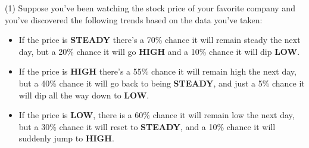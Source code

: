 \begin{tasks}[resume, style=enumerate](1)
\task
  Suppose you've been watching the stock price of your favorite
  company and you've discovered the following trends based on the data
  you've taken:

  \begin{itemize}
  \item
    If the price is \textbf{STEADY} there's a 70\% chance it will
    remain steady the next day, but a 20\% chance it will go
    \textbf{HIGH} and a 10\% chance it will dip \textbf{LOW}.
  \item
    If the price is \textbf{HIGH} there's a 55\% chance it will remain
    high the next day, but a 40\% chance it will go back to being
    \textbf{STEADY}, and just a 5\% chance it will dip all the way
    down to \textbf{LOW}.
  \item
    If the price is \textbf{LOW}, there is a 60\% chance it will
    remain low the next day, but a 30\% chance it will reset to
    \textbf{STEADY}, and a 10\% chance it will suddenly jump to
    \textbf{HIGH}.
  \end{itemize}


\end{tasks}
